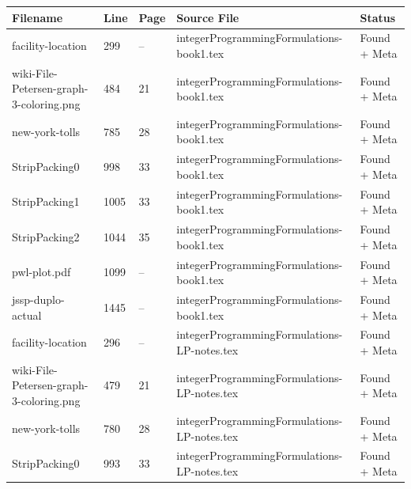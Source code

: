 \documentclass[11pt]{article}
\begin{document}
\begin{longtable}{|p{3.5cm}|p{1.5cm}|p{1cm}|p{4cm}|p{2cm}|}
\hline
\textbf{Filename} & \textbf{Line} & \textbf{Page} & \textbf{Source File} & \textbf{Status} \\
\hline
\endhead

facility-location & 299 & -- & integerProgrammingFormulations-book1.tex & \textcolor{found}{Found + Meta} \\
\hline

wiki-File-Petersen-graph-3-coloring.png & 484 & 21 & integerProgrammingFormulations-book1.tex & \textcolor{found}{Found + Meta} \\
\hline

new-york-tolls & 785 & 28 & integerProgrammingFormulations-book1.tex & \textcolor{found}{Found + Meta} \\
\hline

StripPacking0 & 998 & 33 & integerProgrammingFormulations-book1.tex & \textcolor{found}{Found + Meta} \\
\hline

StripPacking1 & 1005 & 33 & integerProgrammingFormulations-book1.tex & \textcolor{found}{Found + Meta} \\
\hline

StripPacking2 & 1044 & 35 & integerProgrammingFormulations-book1.tex & \textcolor{found}{Found + Meta} \\
\hline

pwl-plot.pdf & 1099 & -- & integerProgrammingFormulations-book1.tex & \textcolor{found}{Found + Meta} \\
\hline

jssp-duplo-actual & 1445 & -- & integerProgrammingFormulations-book1.tex & \textcolor{found}{Found + Meta} \\
\hline

facility-location & 296 & -- & integerProgrammingFormulations-LP-notes.tex & \textcolor{found}{Found + Meta} \\
\hline

wiki-File-Petersen-graph-3-coloring.png & 479 & 21 & integerProgrammingFormulations-LP-notes.tex & \textcolor{found}{Found + Meta} \\
\hline

new-york-tolls & 780 & 28 & integerProgrammingFormulations-LP-notes.tex & \textcolor{found}{Found + Meta} \\
\hline

StripPacking0 & 993 & 33 & integerProgrammingFormulations-LP-notes.tex & \textcolor{found}{Found + Meta} \\
\hline


\end{longtable}
\end{document}
